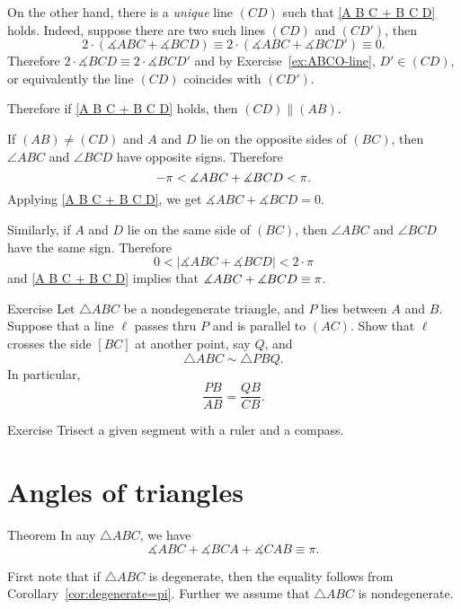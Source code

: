On the other hand, there is a \emph{unique} line $(CD)$ such that \ref{A B C + B C D} holds.
Indeed, suppose there are two such lines $(CD)$ and $(CD')$, then
$$2\cdot(\measuredangle A B C+\measuredangle B C D)\equiv 2\cdot(\measuredangle A B C+\measuredangle B C D')\equiv0.
$$ 
Therefore 
$2\cdot\measuredangle B C D\equiv 2\cdot\measuredangle B C D'$
and by Exercise~\ref{ex:ABCO-line},  $D'\in (CD)$, or equivalently the line $(CD)$ coincides with $(CD')$.

Therefore if \ref{A B C + B C D} holds, then $(CD)\parallel (AB)$.


If $(AB)\ne(C D)$ and $A$ and $D$ lie on the opposite sides of $(BC)$, then $\angle ABC$ and $\angle BCD$ have opposite signs.
Therefore
\[-\pi\z<\measuredangle A B C+\measuredangle B C D<\pi.\]
Applying \ref{A B C + B C D}, we get $\measuredangle A B C+\measuredangle B C D=0$.

Similarly, if $A$ and $D$ lie on the same side of $(BC)$,
then $\angle ABC$ and $\angle BCD$ have the same sign.
Therefore
\[0<|\measuredangle A B C+\measuredangle B C D|<2\cdot\pi\]
and \ref{A B C + B C D} implies that $\measuredangle A B C+\measuredangle B C D\z\equiv\pi$.
\qeds

\begin{thm}{Exercise}\label{ex:smililar+parallel}
Let $\triangle ABC$ be a nondegenerate triangle, and $P$ lies between $A$ and $B$.
Suppose that a line $\ell$ passes thru $P$ and is parallel to $(AC)$.
Show that $\ell$ crosses the side $[BC]$ at another point, say $Q$, and 
\[\triangle ABC\sim\triangle PBQ.\]
In particular, 
\[\frac{PB}{AB}=\frac{QB}{CB}.\]

\end{thm} 

\begin{thm}{Exercise}\label{ex:trisection}
Trisect a given segment with a ruler and a compass.
\end{thm}

\section{Angles of triangles}

\begin{thm}{Theorem}\label{thm:3sum}
In any $\triangle A B C$, we have
$$\measuredangle A B C+ \measuredangle B C A + \measuredangle C A B \equiv \pi.$$

\end{thm}

First note that 
if $\triangle A B C$ is degenerate, then the equality follows from Corollary~\ref{cor:degenerate=pi}.
Further we assume that $\triangle A B C$ is nondegenerate.

